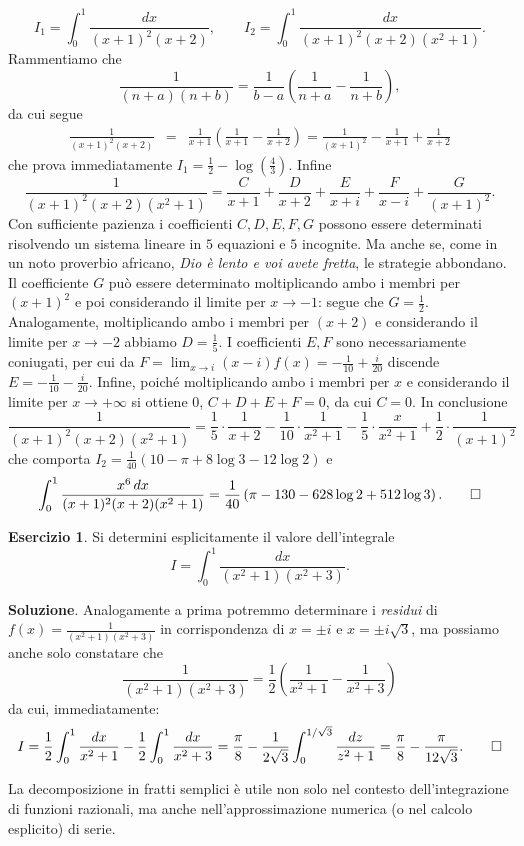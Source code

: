 \documentclass[a4paper,twoside]{article}
\theoremstyle{definition}
\newtheorem{ex}[theorem]{Esercizio}
\numberwithin{theorem}{section}
\begin{document}
$$I_1=\int_{0}^{1}\frac{dx}{(x+1)^2(x+2)},\qquad I_2=\int_{0}^{1}\frac{dx}{(x+1)^2(x+2)(x^2+1)}.$$
Rammentiamo che $$\frac{1}{(n+a)(n+b)}=\frac{1}{b-a}\left(\frac{1}{n+a}-\frac{1}{n+b}\right),$$
da cui segue 
\begin{eqnarray*} \frac{1}{(x+1)^2(x+2)}&=&\frac{1}{x+1}\left(\frac{1}{x+1}-\frac{1}{x+2}\right)=\frac{1}{(x+1)^2}-\frac{1}{x+1}+\frac{1}{x+2}\end{eqnarray*}
che prova immediatamente $I_1=\frac{1}{2}-\log\left(\frac{4}{3}\right)$. Infine 
$$ \frac{1}{(x+1)^2(x+2)(x^2+1)}=\frac{C}{x+1}+\frac{D}{x+2}+\frac{E}{x+i}+\frac{F}{x-i}+\frac{G}{(x+1)^2}.$$
Con sufficiente pazienza i coefficienti $C,D,E,F,G$ possono essere determinati risolvendo un sistema lineare in $5$ equazioni e $5$ incognite. Ma anche se, come in un noto proverbio africano, \emph{Dio è lento e voi avete fretta}, le strategie abbondano. Il coefficiente $G$ può essere determinato moltiplicando ambo i membri per $(x+1)^2$ e poi considerando il limite per $x\to -1$: segue che $G=\frac{1}{2}$. Analogamente, moltiplicando ambo i membri per $(x+2)$ e considerando il limite per $x\to -2$ abbiamo $D=\frac{1}{5}$. I coefficienti $E,F$ sono necessariamente coniugati, per cui da $F=\lim_{x\to i}(x-i)f(x)=-\frac{1}{10}+\frac{i}{20}$ discende $E=-\frac{1}{10}-\frac{i}{20}$. Infine, poiché moltiplicando ambo i membri per $x$ e considerando il limite per $x\to +\infty$ si ottiene $0$, $C+D+E+F=0$, da cui $C=0$. In conclusione 
$$ \frac{1}{(x+1)^2(x+2)(x^2+1)} = \frac{1}{5}\cdot\frac{1}{x+2}-\frac{1}{10}\cdot\frac{1}{x^2+1}-\frac{1}{5}\cdot\frac{x}{x^2+1}+\frac{1}{2}\cdot\frac{1}{(x+1)^2} $$
che comporta $I_2=\frac{1}{40}\left(10-\pi+8\log 3-12\log 2\right)$ e 
$$ \int_{0}^{1}\frac{x^6\,dx}{(x+1)^2(x+2)(x^2+1)}=\frac{1}{40}\left(\pi-130-628\log 2+512\log 3\right).\qed $$
\begin{ex} Si determini esplicitamente il valore dell'integrale 
$$ I=\int_{0}^{1}\frac{dx}{(x^2+1)(x^2+3)}. $$
\end{ex}
\textbf{Soluzione}. Analogamente a prima potremmo determinare i \emph{residui} di $f(x)=\frac{1}{(x^2+1)(x^2+3)}$ in corrispondenza di $x=\pm i$ e $x=\pm i\sqrt{3}$, ma possiamo anche solo constatare che 
$$ \frac{1}{(x^2+1)(x^2+3)} = \frac{1}{2}\left(\frac{1}{x^2+1}-\frac{1}{x^2+3}\right) $$
da cui, immediatamente:
$$ I = \frac{1}{2}\int_{0}^{1}\frac{dx}{x^2+1}-\frac{1}{2}\int_{0}^{1}\frac{dx}{x^2+3}=\frac{\pi}{8}-\frac{1}{2\sqrt{3}}\int_{0}^{1/\sqrt{3}}\frac{dz}{z^2+1} = \frac{\pi}{8}-\frac{\pi}{12\sqrt{3}}.\qed$$

La decomposizione in fratti semplici è utile non solo nel contesto dell'integrazione di funzioni razionali, ma anche nell'approssimazione numerica (o nel calcolo esplicito) di serie.
\end{document}
